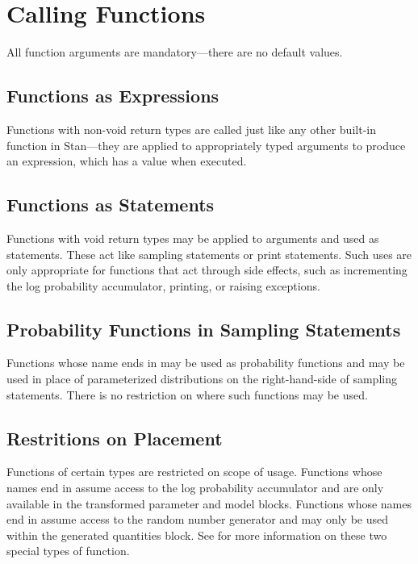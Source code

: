\section{Calling Functions}

All function arguments are mandatory---there are no default values.

\subsection{Functions as Expressions}

Functions with non-void return types are called just like any other
built-in function in Stan---they are applied to appropriately typed
arguments to produce an expression, which has a value when executed.

\subsection{Functions as Statements}

Functions with void return types may be applied to arguments and used
as statements.  These act like sampling statements or print
statements.  Such uses are only appropriate for functions that act
through side effects, such as incrementing the log probability
accumulator, printing, or raising exceptions.

\subsection{Probability Functions in Sampling Statements}

Functions whose name ends in  may be used as probability
functions and may be used in place of parameterized distributions on
the right-hand-side of sampling statements.   There is no restriction
on where such functions may be used.

\subsection{Restritions on Placement}

Functions of certain types are restricted on scope of usage.
Functions whose names end in  assume access to the log
probability accumulator and are only available in the transformed
parameter and model blocks.  Functions whose names end in 
assume access to the random number generator and may only be used
within the generated quantities block.  See  for more
information on these two special types of function.

